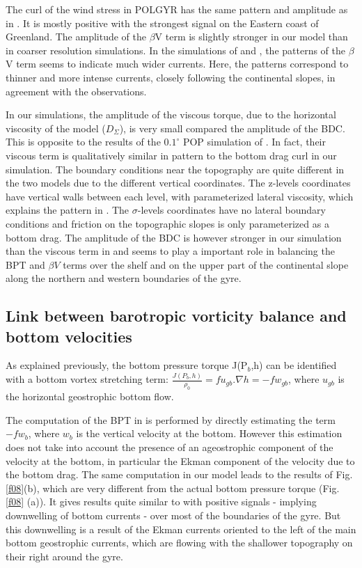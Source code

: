 \documentclass[os, manuscript]{copernicus}
\begin{document}
The curl of the wind stress in POLGYR has the same pattern and amplitude as in \citet{yeager2015}. It is mostly positive with the strongest signal on the Eastern coast of Greenland. The amplitude of the $\beta$V term is slightly stronger in our model than in coarser resolution simulations. In the simulations of \citet{hughes2001} and \citet{yeager2015}, the patterns of the $\beta$V term seems to indicate much wider currents. Here, the patterns correspond to thinner and more intense currents, closely following the continental slopes, in agreement with the observations.

In our simulations, the amplitude of the viscous torque, due to the horizontal viscosity of the model ($D_{\Sigma}$), is very small compared the amplitude of the BDC. This is opposite to the results of the $0.1^{\circ}$ POP simulation of \citet{yeager2015}. In fact, their viscous term is qualitatively similar in pattern to the bottom drag curl in our simulation. The boundary conditions near the topography are quite different in the two models due to the different vertical coordinates. The z-levels coordinates have vertical walls between each level, with parameterized lateral viscosity, which explains the pattern in \citet{yeager2015}. The $\sigma$-levels coordinates have no lateral boundary conditions and friction on the topographic slopes is only parameterized as a bottom drag. The amplitude of the BDC is however stronger in our simulation than the viscous term in \citet{yeager2015} and seems to play a important role in balancing the BPT and $\beta V$ terms over the shelf and on the upper part of the continental slope along the northern and western boundaries of the gyre.

\subsection{Link between barotropic vorticity balance and bottom velocities}

As explained previously, the bottom pressure torque J(P$_b$,h) can be identified with a bottom vortex stretching term: $\frac{J(P_b,h)}{\rho _0}=f u_{gb}.\nabla h = -f w_{gb}$, where $u_{gb}$ is the horizontal geostrophic bottom flow. 

The computation of the BPT in \citet{spence2012} is performed by directly estimating the term  $-f w_{b}$, where $w_{b}$ is the vertical velocity at the bottom. However this estimation does not take into account the presence of an ageostrophic component of the velocity at the bottom, in particular the Ekman component of the velocity due to the bottom drag. The same computation in our model leads to the results of Fig. \ref{f08}(b), which are very different from the actual bottom pressure torque (Fig. \ref{f08} (a)). It gives results quite similar to \citet{spence2012} with positive signals - implying downwelling of bottom currents - over most of the boundaries of the gyre. But this downwelling is a result of the Ekman currents oriented to the left of the main bottom geostrophic currents, which are flowing with the shallower topography on their right around the gyre.
\end{document}

